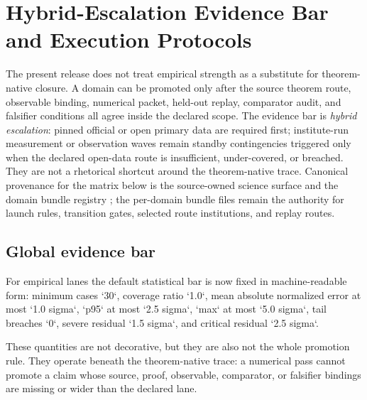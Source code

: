 \section{Hybrid-Escalation Evidence Bar and Execution Protocols}
\label{sec:oc-core-1-3-empirical-execution-protocols}

The present release does not treat empirical strength as a substitute for theorem-native closure. A domain can be promoted only after the source theorem route, observable binding, numerical packet, held-out replay, comparator audit, and falsifier conditions all agree inside the declared scope.
The evidence bar is \emph{hybrid escalation}: pinned official or open primary data are required first; institute-run measurement or observation waves remain standby contingencies triggered only when the declared open-data route is insufficient, under-covered, or breached. They are not a rhetorical shortcut around the theorem-native trace.
Canonical provenance for the matrix below is the source-owned science surface
and the domain bundle registry
;
the per-domain bundle files remain the authority for launch rules, transition
gates, selected route institutions, and replay routes.

\subsection{Global evidence bar}
For empirical lanes the default statistical bar is now fixed in machine-readable form: minimum cases `30`, coverage ratio `1.0`, mean absolute normalized error at most `1.0 sigma`, `p95` at most `2.5 sigma`, `max` at most `5.0 sigma`, tail breaches `0`, severe residual `1.5 sigma`, and critical residual `2.5 sigma`.

These quantities are not decorative, but they are also not the whole promotion rule. They operate beneath the theorem-native trace: a numerical pass cannot promote a claim whose source, proof, observable, comparator, or falsifier bindings are missing or wider than the declared lane.

